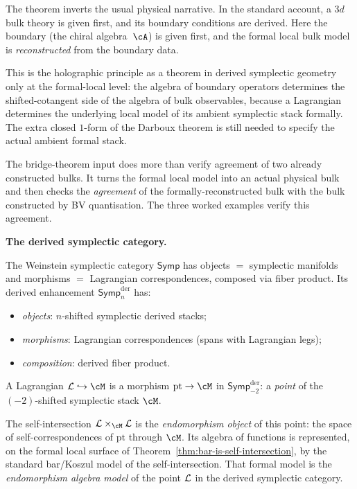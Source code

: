 \begin{remark}
\label{rem:boundary-creates-bulk-conclusion}
The theorem inverts the usual physical narrative. In the standard
account, a $3d$ bulk theory is given first, and its boundary
conditions are derived. Here the boundary (the chiral
algebra~$\cA$) is given first, and the formal local bulk model is
\emph{reconstructed} from the boundary data.

This is the holographic principle as a theorem in derived symplectic
geometry only at the formal-local level: the algebra of boundary
operators determines the shifted-cotangent side of the algebra
of bulk observables, because a Lagrangian determines the underlying
local model of its ambient symplectic stack formally. The extra
closed $1$-form of the Darboux theorem is still needed to specify the
actual ambient formal stack.

The bridge-theorem input does more than verify agreement of two already
constructed bulks. It turns the formal local model into an actual
physical bulk and then checks the \emph{agreement} of the
formally-reconstructed bulk with the bulk constructed by BV quantisation.
The three worked examples verify this agreement.
\end{remark}

\bigskip

\noindent\textbf{The derived symplectic category.}


\begin{construction}
\label{con:point-endomorphism}
The Weinstein symplectic category $\mathsf{Symp}$ has objects
$=$ symplectic manifolds and morphisms $=$ Lagrangian
correspondences, composed via fiber product. Its derived
enhancement $\mathsf{Symp}^{\mathrm{der}}_n$ has:
\begin{itemize}[leftmargin=1.8em]
\item \emph{objects}: $n$-shifted symplectic derived stacks;
\item \emph{morphisms}: Lagrangian correspondences
 (spans with Lagrangian legs);
\item \emph{composition}: derived fiber product.
\end{itemize}
A Lagrangian $\cL \hookrightarrow \cM$ is a morphism
$\mathrm{pt} \to \cM$ in $\mathsf{Symp}^{\mathrm{der}}_{-2}$:
a \emph{point} of the $(-2)$-shifted symplectic stack $\cM$.

The self-intersection $\cL \times_\cM \cL$ is the
\emph{endomorphism object} of this point: the space of
self-correspondences of $\mathrm{pt}$ through $\cM$. Its algebra
of functions is represented, on the formal local surface of
Theorem~\ref{thm:bar-is-self-intersection}, by the standard
bar/Koszul model of the self-intersection. That formal model is the
\emph{endomorphism algebra model} of the point $\mathcal{L}$ in the derived
symplectic category.
\end{construction}

